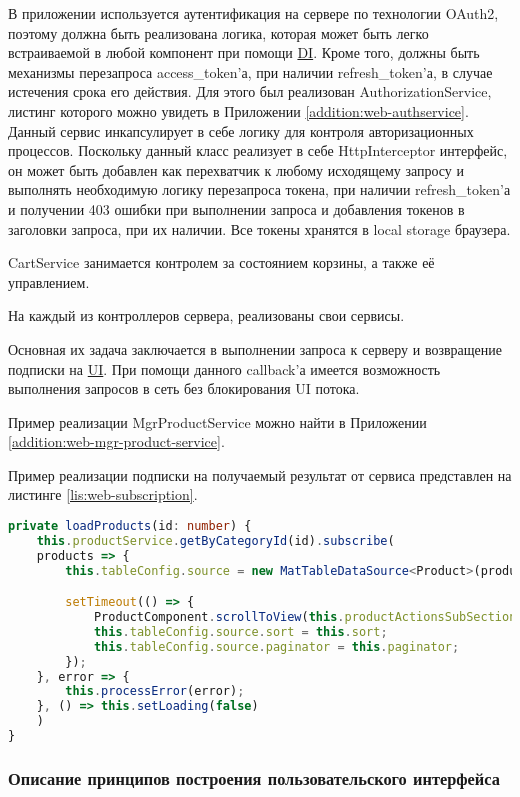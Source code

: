 В приложении используется аутентификация на сервере по технологии OAuth2, поэтому должна быть реализована логика, 
которая может быть легко встраиваемой в любой компонент при помощи \hyperlink{gloss:di}{DI}. 
Кроме того, должны быть механизмы перезапроса access\_token’а, при наличии refresh\_token’а, в случае истечения срока его действия.
Для этого был реализован AuthorizationService, листинг которого можно увидеть в Приложении \ref{addition:web-authservice}.
Данный сервис инкапсулирует в себе логику для контроля авторизационных процессов.
Поскольку данный класс реализует в себе HttpInterceptor интерфейс, он может быть добавлен как перехватчик к любому исходящему запросу и выполнять необходимую логику перезапроса токена, при наличии refresh\_token’а и получении 403 ошибки при выполнении запроса и добавления токенов в заголовки запроса, при их наличии.
Все токены хранятся в local storage браузера.

CartService занимается контролем за состоянием корзины, а также её управлением.

На каждый из контроллеров сервера, реализованы свои сервисы.

Основная их задача заключается в выполнении запроса к серверу и возвращение подписки на \hyperlink{gloss:ui}{UI}.
При помощи данного callback’а имеется возможность выполнения запросов в сеть без блокирования UI потока.

Пример реализации MgrProductService можно найти в Приложении \ref{addition:web-mgr-product-service}.

Пример реализации подписки на получаемый результат от сервиса представлен на листинге \ref{lis:web-subscription}.

\begin{lstlisting}[language=TypeScript, captionpos=b,
label={lis:web-subscription},
caption={Пример реализации подписки на ожидаемый результат от сервера}
]
private loadProducts(id: number) {
    this.productService.getByCategoryId(id).subscribe(
    products => {
        this.tableConfig.source = new MatTableDataSource<Product>(products);

        setTimeout(() => {
            ProductComponent.scrollToView(this.productActionsSubSection);
            this.tableConfig.source.sort = this.sort;
            this.tableConfig.source.paginator = this.paginator;
        });
    }, error => {
        this.processError(error);
    }, () => this.setLoading(false)
    )
}
\end{lstlisting}

\subsubsection{Описание принципов построения пользовательского интерфейса}\indent

